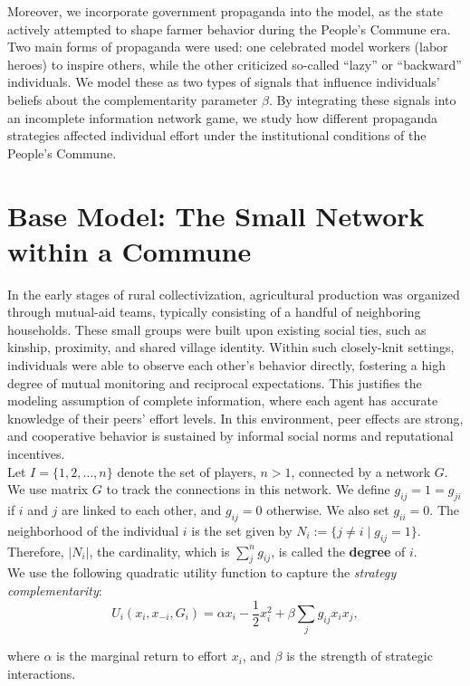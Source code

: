 \documentclass[12pt]{article}
\begin{document}
Moreover, we incorporate government propaganda into the model, as the state actively attempted to shape farmer behavior during the People's Commune era. Two main forms of propaganda were used: one celebrated model workers (labor heroes) to inspire others, while the other criticized so-called “lazy” or “backward” individuals. We model these as two types of signals that influence individuals' beliefs about the complementarity parameter $\beta$. By integrating these signals into an incomplete information network game, we study how different propaganda strategies affected individual effort under the institutional conditions of the People's Commune.

\section{Base Model: The Small Network within a Commune}
In the early stages of rural collectivization, agricultural production was organized through mutual-aid teams, typically consisting of a handful of neighboring households. These small groups were built upon existing social ties, such as kinship, proximity, and shared village identity. Within such closely-knit settings, individuals were able to observe each other’s behavior directly, fostering a high degree of mutual monitoring and reciprocal expectations. This justifies the modeling assumption of complete information, where each agent has accurate knowledge of their peers’ effort levels. In this environment, peer effects are strong, and cooperative behavior is sustained by informal social norms and reputational incentives.\\

Let $I = \{1, 2, \dots, n\}$ denote the set of players, $n > 1$, connected by a network $G$. We use matrix $G$ to track the connections in this network. We define $g_{ij} = 1=g_{ji}$ if $i$ and $j$ are linked to each other, and $g_{ij} = 0$ otherwise.  We also set $g_{ii} = 0$. The neighborhood of the individual $i$ is the set given by $ N_i := \{j \ne i \mid g_{ij} = 1\}$. Therefore, $|N_i|$, the cardinality, which is $\sum_j^n g_{ij}$, is called the \textbf{degree} of $i$.\\

We use the following quadratic utility function to capture the \emph{strategy complementarity}:
\[
U_i(x_i, x_{-i}, G_i) = \alpha x_i - \frac{1}{2} x_i^2 + \beta \sum_j g_{ij}x_i  x_j,
\]

where $\alpha$ is the marginal return to effort $x_i$, and $\beta$ is the strength of strategic interactions.
\end{document}

